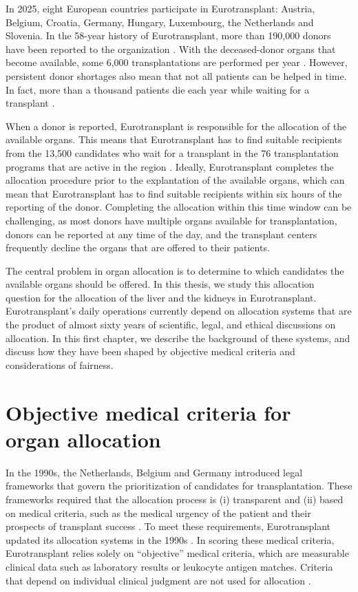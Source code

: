 \documentclass[11pt,twoside,]{book}
\begin{document}
In 2025, eight European countries participate in Eurotransplant: Austria, Belgium,
Croatia, Germany, Hungary, Luxembourg, the Netherlands and Slovenia. In
the 58-year history of Eurotransplant, more than 190,000 donors have been reported
to the organization \citep{etStatsLibrary3002P}. With the deceased-donor organs that
become available, some 6,000 transplantations are performed per year \citep{etStatsLibrary2082P}. However,
persistent donor shortages also mean that not all patients can be helped in time.
In fact, more than a thousand patients die each year while waiting for a
transplant \citep{etStatsLibrary4512P}.

When a donor is reported, Eurotransplant is responsible for
the allocation of the available organs. This means that Eurotransplant has to find
suitable recipients from the 13,500 candidates who wait for a transplant
in the 76 transplantation programs that are active in the region \citep{etStatsLibrary3002P}. Ideally, Eurotransplant
completes the allocation procedure prior to the explantation of the available organs, which can mean that Eurotransplant has to
find suitable recipients within six hours of the reporting of the donor. Completing the allocation
within this time window can be challenging, as most donors have multiple
organs available for transplantation, donors can be reported at any time of the day,
and the transplant centers frequently decline the organs that are offered to
their patients.

The central problem in organ allocation is to determine to which candidates the
available organs should be offered. In this thesis, we study this allocation
question for the allocation of the liver and the kidneys in Eurotransplant.
Eurotransplant's daily operations currently depend on allocation systems that
are the product of almost sixty years of scientific, legal, and ethical discussions
on allocation. In this first chapter, we describe the background of these systems,
and discuss how they have been shaped by objective medical criteria and considerations
of fairness.

\section{Objective medical criteria for organ allocation}\label{objective-medical-criteria-for-organ-allocation}

In the 1990s, the Netherlands, Belgium and Germany introduced legal frameworks
that govern the prioritization of candidates for transplantation. These frameworks
required that the allocation process is (i) transparent
and (ii) based on medical criteria, such as the medical urgency of the patient
and their prospects of transplant success \citep{HaaseKromwijk1999, Persijn2006}. To meet these
requirements, Eurotransplant updated its allocation systems in
the 1990s \citep{HaaseKromwijk1999}. In scoring these medical criteria,
Eurotransplant relies solely on ``objective'' medical criteria, which are
measurable clinical data such as laboratory results or leukocyte antigen matches.
Criteria that depend on individual clinical judgment are not used for allocation \citep{Persijn2006}.
\end{document}
